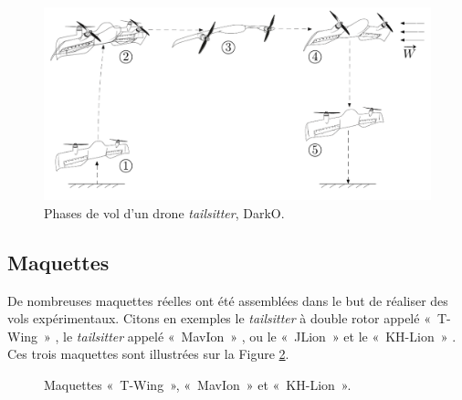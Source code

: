 \begin{figure}[ht!]
    \centering
        \includegraphics[width=0.8\columnwidth]{figures/darko_transition.png}
        \caption{Phases de vol d'un drone \textit{tailsitter}, DarkO.}
        \label{fig:darko_flight}
\end{figure}

\subsection*{Maquettes}

De nombreuses maquettes réelles ont été assemblées dans le but de réaliser des vols expérimentaux. Citons en exemples le \textit{tailsitter} à double rotor appelé «~T-Wing~» \cite{Stone2002PreliminaryDO, TWing2008}, le \textit{tailsitter} appelé «~MavIon~» \cite{oatao14575}, ou le «~JLion~» et le «~KH-Lion~» \cite{8003167}. Ces trois maquettes sont illustrées sur la Figure \ref{fig:maquettetailsitter}.

\begin{figure}[ht!]
    \centering
    \caption{Maquettes «~T-Wing~», «~MavIon~» et «~KH-Lion~».}
    \label{fig:maquettetailsitter}
\end{figure}

